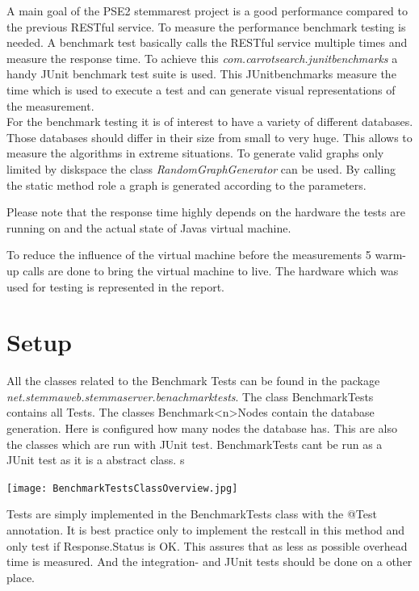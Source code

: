 \documentclass[11pt,fleqn,openany]{book} %
\begin{document}
A main goal of the PSE2 stemmarest project is a good performance compared to the previous RESTful service. To measure the performance benchmark testing is needed. A benchmark test basically calls the RESTful service multiple times and measure the response time. To achieve this \textit{com.carrotsearch.junitbenchmarks} a handy JUnit benchmark test suite is used. This JUnitbenchmarks measure the time which is used to execute a test and can generate visual representations of the measurement.\\
For the benchmark testing it is of interest to have a variety of different databases. Those databases should differ in their size from small to very huge. This allows to measure the algorithms in extreme situations.
To generate valid graphs only limited by diskspace the class \textit{RandomGraphGenerator} can be used. By calling the static method role a graph is generated according to the parameters.\\
\begin{remark}
Please note that the response time highly depends on the hardware the tests are running on and the actual state of Javas virtual machine. 
\end{remark}
To reduce the influence of the virtual machine before the measurements 5 warm-up calls are done to bring the virtual machine to live. The hardware which was used for testing is represented in the report.

\section*{Setup}
All the classes related to the Benchmark Tests can be found in the package \\ \textit{net.stemmaweb.stemmaserver.benachmarktests}. The class BenchmarkTests contains all Tests. The classes Benchmark<n>Nodes contain the database generation. Here is configured how many nodes the database has. This are also the classes which are run with JUnit test. BenchmarkTests cant be run as a JUnit test as it is a abstract class. s

\begin{center}
\texttt{[image: BenchmarkTestsClassOverview.jpg]} 
\end{center}

Tests are simply implemented in the BenchmarkTests class with the @Test annotation. It is best practice only to implement the restcall in this method and only test if Response.Status is OK. This assures that as less as possible overhead time is measured. And the integration- and JUnit tests should be done on a other place.
\end{document}
